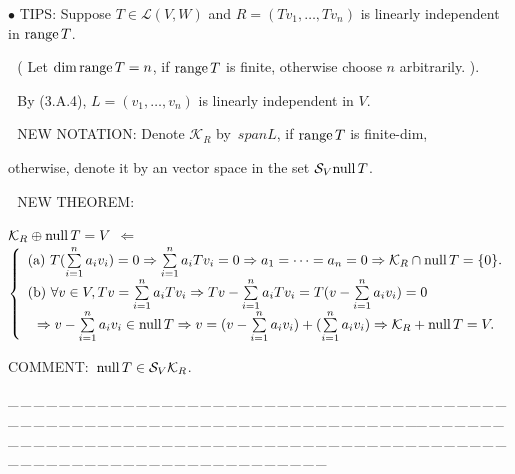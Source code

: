 \documentclass[a4paper, 11pt, UTF8]{article}
\def\range{\textup{range}\,}
\def\null{\textup{null\,}}
\def\Lm{\mathcal{L}}
\begin{document}
\begin{large}
{\small $\bullet$} {\timesbf\Large T{\normalsize IPS:}} {\timessl\Large Suppose $T\in\Lm(V,W)$ and $R=(Tv_1,\dots,Tv_n)$ is linearly independent in $\range T$.}\par\,\,\quad\qquad
{\timessl\normalsize ( Let $\dim\range T=n$, if $\range T$ is finite, otherwise choose $n$ arbitrarily. ).}\par\,\,\quad\qquad
{\timessl\Large By (3.A.4), $L=(v_1,\dots,v_n)$ is linearly independent in $V$.}\par\,\,
{\timesbf\Large N{\normalsize EW} N{\normalsize OTATION:}} {\timessl\Large Denote $\mathcal{K}_R$ by $\,span L$, if $\range T$ is finite-dim,}\par\qquad\quad\qquad\qquad\qquad
{\timessl\Large otherwise, denote it by an vector space in the set $\mathcal{S}_V\null T$.}\par\,\,
{\timesbf\Large N{\normalsize EW} T{\normalsize HEOREM:}}\par\quad
{\Large $\mathcal{K}_R\oplus\null T=V$} {\LARGE $\Leftarrow$} {\small $\left\{\begin{array}{l}
(\textup a)\,\,T(\sum\limits_{i=1}^n a_i v_i)=0\Rightarrow \sum\limits_{i=1}^n a_i Tv_i=0\Rightarrow a_1=\dots=a_n=0\Rightarrow\mathcal{K}_R\cap\null T=\{0\}.\\
(\textup b)\,\,\forall v\in V, Tv=\sum\limits_{i=1}^n a_i Tv_i\Rightarrow Tv-\sum\limits_{i=1}^n a_i Tv_i=T(v-\sum\limits_{i=1}^n a_i v_i)=0\\
\,\,\,\,\Rightarrow v-\sum\limits_{i=1}^n a_i v_i\in\null T\Rightarrow v=(v-\sum\limits_{i=1}^n a_i v_i)+(\sum\limits_{i=1}^n a_i v_i)\Rightarrow\mathcal{K}_R+\null T=V.\\
\end{array}\right.$}\par
{\timesbf\Large C{\normalsize OMMENT:}}\,\,\,$\null T\in\mathcal{S}_V \mathcal{K}_R$.\par
{\tiny \_\,\_\,\_\,\_\,\_\,\_\,\_\,\_\,\_\,\_\,\_\,\_\,\_\,\_\,\_\,\_\,\_\,\_\,\_\,\_\,\_\,\_\,\_\,\_\,\_\,\_\,\_\,\_\,\_\,\_\,\_\,\_\,\_\,\_\,\_\,\_\,\_\,\_\,\_\,\_\,\_\,\_\,\_\,\_\,\_\,\_\,\_\,\_\,\_\,\_\,\_\,\_\,\_\,\_\,\_\,\_\,\_\,\_\,\_\,\_\,\_\,\_\,\_\,\_\,\_\,\_\,\_\,\_\,\_\,\_\,\_\_\,\_\,\_\,\_\,\_\,\_\,\_\,\_\,\_\,\_\,\_\,\_\,\_\,\_\,\_\,\_\,\_\,\_\,\_\,\_\,\_\,\_\,\_\,\_\,\_\,\_\,\_\,\_\,\_\,\_\,\_\,\_\,\_\,\_\,\_\,\_\,\_\,\_\,\_\,\_\,\_\,\_\,\_\,\_\,\_\,\_\,\_\,\_\,\_\,\_\,\_\,\_\,\_\,\_\,\_\,\_\,\_\,\_\,\_\,\_\,\_\,\_\,\_\,\_\,\_\,\_\,\_\,\_\,\_\,\_\,\_}\par


\end{large}
\end{document}
